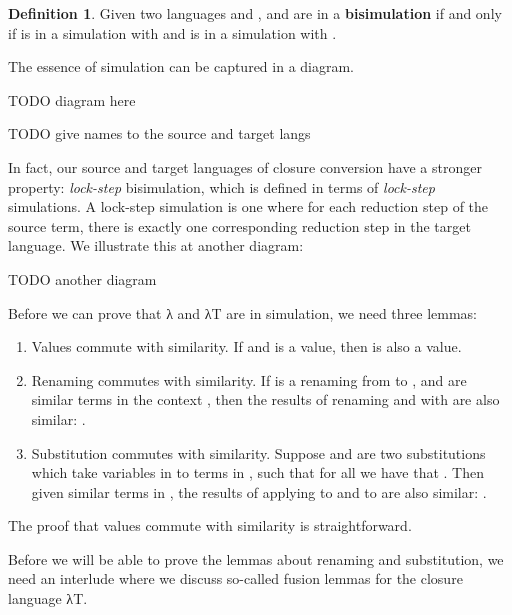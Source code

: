 \documentclass[bsc,frontabs,twoside,singlespacing,parskip,deptreport]{infthesis}
\theoremstyle{definition}
\newtheorem*{definition}{Definition}
\begin{document}
\begin{definition}
Given two languages  and ,   and  are in a
\textbf{bisimulation} if and only if  is in a simulation with  and
 is in a simulation with .
\end{definition}

The essence of simulation can be captured in a diagram.

TODO diagram here

TODO give names to the source and target langs

In fact, our source and target languages of closure conversion have a
stronger property: \textit{lock-step} bisimulation, which is defined
in terms of \textit{lock-step} simulations. A lock-step simulation is
one where for each reduction step of the source term, there is exactly
one corresponding reduction step in the target language. We illustrate
this at another diagram:

TODO another diagram

Before we can prove that λ and λT are in simulation, we need three
lemmas:

\begin{enumerate}
\item
  Values commute with similarity. If  and  is a
  value, then  is also a value.

\item
  Renaming commutes with similarity. If  is a renaming from
   to , and  are similar terms in the context
  , then the results of renaming  and  with 
  are also similar: .

\item
  Substitution commutes with similarity. Suppose  and  are two
  substitutions which take variables  in  to terms in ,
  such that for all  we have that . Then given similar terms  in , the results
  of applying  to  and  to  are also
  similar: .
\end{enumerate}

The proof that values commute with similarity is straightforward.


Before we will be able to prove the lemmas about renaming and substitution, we need an interlude
where we discuss so-called fusion lemmas for the closure language λT.
\end{document}

